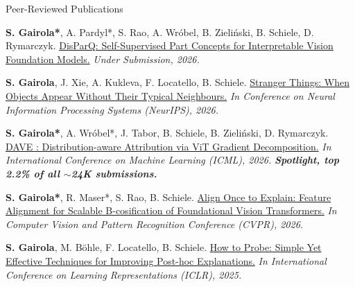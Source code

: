 \documentclass{resume} %
\begin{document}
\begin{rSection}{Peer-Reviewed Publications} \itemsep -2pt


\item[(14.)] \textbf{S. Gairola*}, A. Pardyl*, S. Rao, A. Wróbel, B. Zieliński, B. Schiele, D. Rymarczyk. \href{https://}{DisParQ: Self-Supervised Part Concepts for Interpretable Vision Foundation Models.} \textit{Under Submission, 2026.}

\item[(13.)] \textbf{S. Gairola}, J. Xie, A. Kukleva, F. Locatello, B. Schiele. \href{https://}{Stranger Things: When Objects Appear Without Their Typical Neighbours.} \textit{In Conference on Neural Information Processing Systems (NeurIPS), 2026.}

\item[(12.)] \textbf{S. Gairola*}, A. Wróbel*, J. Tabor, B. Schiele, B. Zieliński, D. Rymarczyk. \href{https://arxiv.org/abs/2602.06613}{DAVE : Distribution-aware Attribution via ViT Gradient Decomposition.} \textit{In International Conference on Machine Learning (ICML), 2026.} \textbf{\textit{Spotlight, top 2.2\% of all $\sim$24K submissions.}}

\item[(11.)] \textbf{S. Gairola*}, R. Maser*, S. Rao, B. Schiele. \href{https://cvpr.thecvf.com/virtual/2026/poster/40400}{Align Once to Explain: Feature Alignment for Scalable B-cosification of Foundational Vision Transformers.} \textit{In Computer Vision and Pattern Recognition Conference (CVPR), 2026.}

\item[(10.)] \textbf{S. Gairola}, M. B{\"o}hle, F. Locatello, B. Schiele. \href{https://openreview.net/pdf?id=57NfyYxh5f}{How to Probe: Simple Yet Effective Techniques for Improving Post-hoc Explanations.} \textit{In International Conference on Learning Representations (ICLR), 2025.}


\end{rSection}
\end{document}
